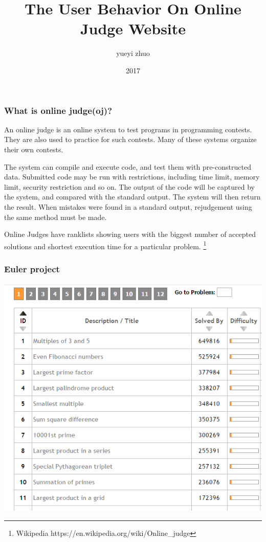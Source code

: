 \documentclass{beamer}
\title[OJ user behavior]{The User Behavior On Online Judge Website }
\author[yiyuezhuo]{yueyi zhuo}
\institute[SICNU]{School of Mathematical,Sichuan Normal University}
\date{2017}
\begin{document}
\frame{\titlepage}

\begin{frame}

\frametitle{What is online judge(oj)?}

An online judge is an online system to test programs in programming contests. 
They are also used to practice for such contests. Many of these systems organize their own contests.

The system can compile and execute code, and test them with pre-constructed data. 
Submitted code may be run with restrictions, including time limit, memory limit, security restriction and so on. 
The output of the code will be captured by the system, and compared with the standard output. 
The system will then return the result. When mistakes were found in a standard output, 
rejudgement using the same method must be made.

Online Judges have ranklists showing users with the biggest number of accepted solutions and shortest 
execution time for a particular problem. \footnote{Wikipedia https://en.wikipedia.org/wiki/Online\_judge}

\end{frame}

\begin{frame}
\frametitle{Euler project}
\includegraphics[scale=0.55]{euler-oj.png}
\end{frame}
\end{document}
